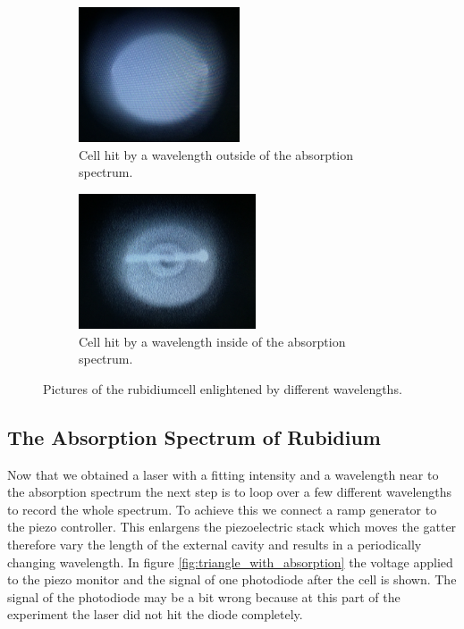 \begin{figure}
  \centering
  \begin{subfigure}{0.45\textwidth}
    \centering
    \includegraphics[height = 4cm]{pics/no_fluo.jpg}
    \caption{Cell hit by a wavelength outside of the absorption spectrum.}
    \label{fig:no_fluo}
  \end{subfigure}
  \begin{subfigure}{0.45\textwidth}
    \centering
    \includegraphics[height = 4cm]{pics/fluo.jpg}
    \caption{Cell hit by a wavelength inside of the absorption spectrum.}
    \label{fig:fluo}
  \end{subfigure}
  \caption{Pictures of the rubidiumcell enlightened by different wavelengths.}
  \label{fig:fluo_no_fluo}
\end{figure}

\subsection{The Absorption Spectrum of Rubidium}

Now that we obtained a laser with a fitting intensity and a wavelength near to the absorption spectrum the next step is to loop over a few different wavelengths to record the whole spectrum. To achieve this we connect a ramp generator to the piezo controller. This enlargens the piezoelectric stack which moves the gatter therefore vary the length of the external cavity and results in a periodically changing wavelength. In figure \ref{fig:triangle_with_absorption} the voltage applied to the piezo monitor and the signal of one photodiode after the cell is shown. The signal of the photodiode may be a bit wrong because at this part of the experiment the laser did not hit the diode completely.


